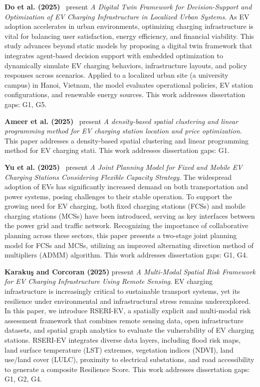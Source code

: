 \documentclass[letterpaper, 12pt, oneside, doublespacing]{Thesis}
\begin{document}
\noindent \textbf{Do et al. (2025)}~\cite{a_2025} present \textit{A Digital Twin Framework for Decision-Support and Optimization of EV Charging Infrastructure in Localized Urban Systems}. As EV adoption accelerates in urban environments, optimizing charging infrastructure is vital for balancing user satisfaction, energy efficiency, and financial viability. This study advances beyond static models by proposing a digital twin framework that integrates agent-based decision support with embedded optimization to dynamically simulate EV charging behaviors, infrastructure layouts, and policy responses across scenarios. Applied to a localized urban site (a university campus) in Hanoi, Vietnam, the model evaluates operational policies, EV station configurations, and renewable energy sources. This work addresses dissertation gaps: G1, G5.



\noindent \textbf{Ameer et al. (2025)}~\cite{hybrid_optimization_2025} present \textit{A density-based spatial clustering and linear programming method for EV charging station location and price optimization}. This paper addresses a density-based spatial clustering and linear programming method for EV charging stati. This work addresses dissertation gaps: G1.



\noindent \textbf{Yu et al. (2025)}~\cite{a_joint_2025} present \textit{A Joint Planning Model for Fixed and Mobile EV Charging Stations Considering Flexible Capacity Strategy}. The widespread adoption of EVs has significantly increased demand on both transportation and power systems, posing challenges to their stable operation. To support the growing need for EV charging, both fixed charging stations (FCSs) and mobile charging stations (MCSs) have been introduced, serving as key interfaces between the power grid and traffic network. Recognizing the importance of collaborative planning across these sectors, this paper presents a two-stage joint planning model for FCSs and MCSs, utilizing an improved alternating direction method of multipliers (ADMM) algorithm. This work addresses dissertation gaps: G1, G4.



\noindent \textbf{Karaku\c{s} and Corcoran (2025)} present \textit{A Multi-Modal Spatial Risk Framework for EV Charging Infrastructure Using Remote Sensing}. EV charging infrastructure is increasingly critical to sustainable transport systems, yet its resilience under environmental and infrastructural stress remains underexplored. In this paper, we introduce RSERI-EV, a spatially explicit and multi-modal risk assessment framework that combines remote sensing data, open infrastructure datasets, and spatial graph analytics to evaluate the vulnerability of EV charging stations. RSERI-EV integrates diverse data layers, including flood risk maps, land surface temperature (LST) extremes, vegetation indices (NDVI), land use/land cover (LULC), proximity to electrical substations, and road accessibility to generate a composite Resilience Score. This work addresses dissertation gaps: G1, G2, G4.
\end{document}
